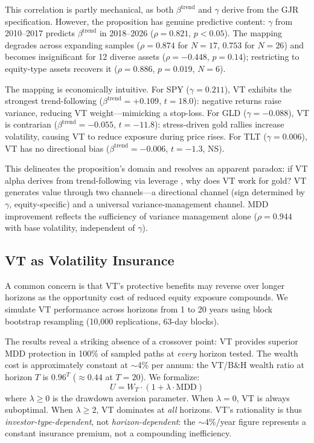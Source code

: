 This correlation is partly mechanical, as both $\beta^{\text{trend}}$ and $\gamma$ derive from the GJR specification. However, the proposition has genuine predictive content: $\gamma$ from 2010--2017 predicts $\beta^{\text{trend}}$ in 2018--2026 ($\rho = 0.821$, $p < 0.05$). The mapping degrades across expanding samples ($\rho = 0.874$ for $N = 17$, $0.753$ for $N = 26$) and becomes insignificant for 12 diverse assets ($\rho = -0.448$, $p = 0.14$); restricting to equity-type assets recovers it ($\rho = 0.886$, $p = 0.019$, $N = 6$).

The mapping is economically intuitive. For SPY ($\gamma = 0.211$), VT exhibits the strongest trend-following ($\beta^{\text{trend}} = +0.109$, $t = 18.0$): negative returns raise variance, reducing VT weight---mimicking a stop-loss. For GLD ($\gamma = -0.088$), VT is contrarian ($\beta^{\text{trend}} = -0.055$, $t = -11.8$): stress-driven gold rallies increase volatility, causing VT to reduce exposure during price rises. For TLT ($\gamma = 0.006$), VT has no directional bias ($\beta^{\text{trend}} = -0.006$, $t = -1.3$, NS).

This delineates the proposition's domain and resolves an apparent paradox: if VT alpha derives from trend-following via leverage \citep{hood2025}, why does VT work for gold? VT generates value through two channels---a directional channel (sign determined by $\gamma$, equity-specific) and a universal variance-management channel. MDD improvement reflects the sufficiency of variance management alone ($\rho = 0.944$ with base volatility, independent of $\gamma$).

\subsection{VT as Volatility Insurance}
\label{sec:vt_insurance}

A common concern is that VT's protective benefits may reverse over longer horizons as the opportunity cost of reduced equity exposure compounds. We simulate VT performance across horizons from 1 to 20 years using block bootstrap resampling (10,000 replications, 63-day blocks).

The results reveal a striking absence of a crossover point: VT provides superior MDD protection in 100\% of sampled paths at \textit{every} horizon tested. The wealth cost is approximately constant at $\sim$4\% per annum: the VT/B\&H wealth ratio at horizon $T$ is $0.96^T$ ($\approx 0.44$ at $T = 20$). We formalize:
\begin{equation}
U = W_T \cdot (1 + \lambda \cdot \text{MDD})
\label{eq:mdd_utility}
\end{equation}
where $\lambda \geq 0$ is the drawdown aversion parameter. When $\lambda = 0$, VT is always suboptimal. When $\lambda \geq 2$, VT dominates at \textit{all} horizons. VT's rationality is thus \textit{investor-type-dependent}, not \textit{horizon-dependent}: the $\sim$4\%/year figure represents a constant insurance premium, not a compounding inefficiency.

